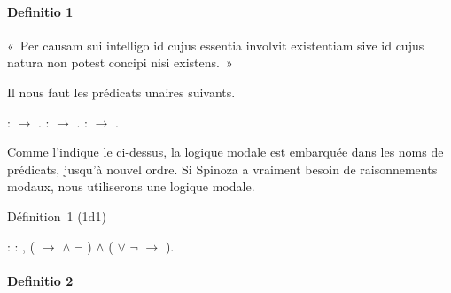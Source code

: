 \documentclass[12pt]{report}
\begin{document}
\paragraph{Definitio 1}

 « Per causam sui intelligo id cujus essentia involvit existentiam
  sive id cujus natura non potest concipi nisi existens. » 

 Il nous faut les prédicats unaires suivants. \begin{coqdoccode}
\coqdocemptyline
\coqdocindent{1.00em}
 :  \ensuremath{\rightarrow} .\coqdoceol
\coqdocindent{1.00em}
 :  \ensuremath{\rightarrow} .\coqdoceol
\coqdocindent{1.00em}
 :  \ensuremath{\rightarrow} .\coqdoceol
\coqdocemptyline
\end{coqdoccode}
Comme l'indique le  ci-dessus, la logique modale est
  embarquée dans les noms de prédicats, jusqu'à nouvel ordre. Si Spinoza
  a vraiment besoin de raisonnements modaux, nous utiliserons une
  logique modale. 

 Définition 1 (1d1) \begin{coqdoccode}
\coqdocindent{1.00em}
 : \coqdoceol
\coqdocindent{2.00em}
\coqdockw{\ensuremath{\forall}} : , \coqdoceol
\coqdocindent{3.00em}
(  \coqdoceol
\coqdocindent{3.50em}
\ensuremath{\rightarrow}   \coqdoceol
\coqdocindent{5.00em}
\ensuremath{\land} \ensuremath{\lnot} ) \coqdoceol
\coqdocindent{3.00em}
\ensuremath{\land} \coqdoceol
\coqdocindent{3.00em}
(  \coqdoceol
\coqdocindent{3.50em}
\ensuremath{\lor} \ensuremath{\lnot}  \coqdoceol
\coqdocindent{3.50em}
\ensuremath{\rightarrow}  ).\coqdoceol
\coqdocemptyline
\end{coqdoccode}
\paragraph{Definitio 2}
\end{document}
